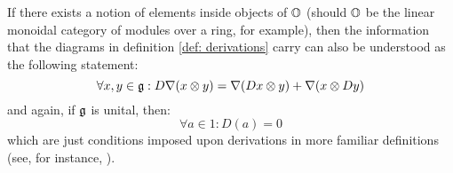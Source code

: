                     \begin{remark}
                        If there exists a notion of elements inside objects of $\mathbb{O}$ (should $\mathbb{O}$ be the linear monoidal category of modules over a ring, for example), then the information that the diagrams in definition \ref{def: derivations} carry can also be understood as the following statement:
                            $$\forall x, y \in \g: D \nabla(x \tensor y) = \nabla(Dx \tensor y) + \nabla(x \tensor Dy)$$
                        and again, if $\mathfrak{g}$ is unital, then:
                            $$\forall a \in 1: D(a) = 0$$
                        which are just conditions imposed upon derivations in more familiar definitions (see, for instance, \cite[\href{https://stacks.math.columbia.edu/tag/00RN}{Tag 00RN}]{stacks}). 
                    \end{remark}
                    
